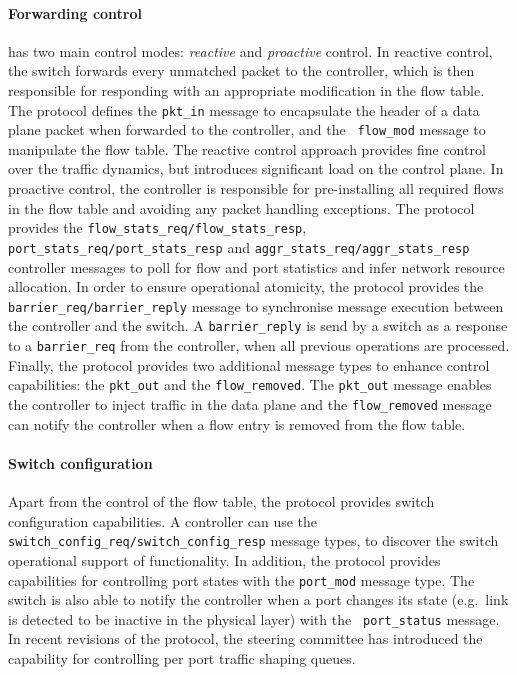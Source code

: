 \paragraph{Forwarding control}

\of has two main control modes: \emph{reactive} and \emph{proactive}
control. In reactive control, the switch forwards every unmatched packet to the
controller, which is then responsible for responding with an appropriate modification in the
flow table. The protocol defines the {\tt pkt\_in} message to encapsulate the
header of a data plane packet when forwarded to the controller, and the {\tt
  flow\_mod} message to manipulate the flow table. The reactive control
approach provides fine control over the traffic dynamics, but introduces
significant load on the control plane. In proactive control, the controller is
responsible for pre-installing all required flows in the flow table and avoiding any
packet handling exceptions. The \of protocol provides the
\texttt{flow\_stats\_req/flow\_stats\_resp},
\texttt{port\_stats\_req/port\_stats\_resp} and
\texttt{aggr\_stats\_req/aggr\_stats\_resp} controller messages to poll for flow
and port statistics and infer network resource allocation. In order to ensure
operational atomicity, the protocol provides the
\texttt{barrier\_req/barrier\_reply} message to synchronise message execution
between the controller and the switch. A {\tt barrier\_reply} is send by a
switch as a response to a {\tt barrier\_req} from the controller, when all
previous operations are processed.  Finally, the \of protocol provides two
additional message types to enhance control capabilities: the {\tt pkt\_out} and
the {\tt flow\_removed}. The {\tt pkt\_out} message enables the controller to
inject traffic in the data plane and the {\tt flow\_removed} message can notify
the controller when a flow entry is removed from the flow table.

\paragraph{Switch configuration} 

Apart from the control of the flow table, the \of protocol provides switch
configuration capabilities. A controller can use the {\tt
  switch\_config\_req/switch\_config\_resp} message types, to discover the
switch operational support of \of functionality.  In addition, the protocol
provides capabilities for controlling port states with the {\tt port\_mod} message
type. The switch is also able to notify the controller when a port changes its
state (e.g.~link is detected to be inactive in the physical layer) with the {\tt
  port\_status} message. In recent revisions of the protocol, the steering
committee has introduced the capability for controlling per port traffic shaping
queues. 

